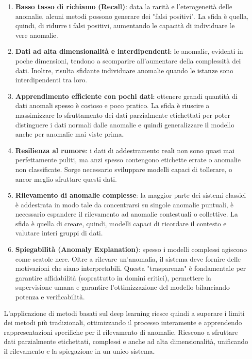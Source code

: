 \begin{enumerate}
    \item \textbf{Basso tasso di richiamo (Recall)}: data la rarità e l'eterogeneità delle anomalie, alcuni metodi possono generare dei "falsi positivi". La sfida è quella, quindi, di ridurre i falsi positivi, aumentando le capacità di individuare le vere anomalie.
    \item \textbf{Dati ad alta dimensionalità e interdipendenti}: le anomalie, evidenti in poche dimensioni, tendono a scomparire all'aumentare della complessità dei dati. Inoltre, risulta sfidante individuare anomalie quando le istanze sono interdipendenti tra loro.
    \item \textbf{Apprendimento efficiente con pochi dati}: ottenere grandi quantità di dati anomali spesso è costoso e poco pratico. La sfida è riuscire a massimizzare lo sfruttamento dei dati parzialmente etichettati per poter distinguere i dati normali dalle anomalie e quindi generalizzare il modello anche per anomalie mai viste prima.
    \item \textbf{Resilienza al rumore}: i dati di addestramento reali non sono quasi mai perfettamente puliti, ma anzi spesso contengono etichette errate o anomalie non classificate. Sorge necessario sviluppare modelli capaci di tollerare, o ancor meglio sfruttare questi dati.
    \item \textbf{Rilevamento di anomalie complesse}: la maggior parte dei sistemi classici è addestrata in modo tale da concentrarsi su singole anomalie puntuali, è necessario espandere il rilevamento ad anomalie contestuali o collettive. La sfida è quella di creare, quindi, modelli capaci di ricordare il contesto e valutare interi gruppi di dati.
    \item \textbf{Spiegabilità (Anomaly Explanation)}: spesso i modelli complessi agiscono come scatole nere. Oltre a rilevare un'anomalia, il sistema deve fornire delle motivazioni che siano interpretabili. Questa "trasparenza" è fondamentale per garantire affidabilità (soprattutto in domini critici), permettere la supervisione umana e garantire l'ottimizzazione del modello bilanciando potenza e verificabilità.
\end{enumerate} 

L'applicazione di metodi basati sul deep learning riesce quindi a superare i limiti dei metodi più tradizionali, ottimizzando il processo interamente e apprendendo rappresentazioni specifiche per il rilevamento di anomalie. Riescono a sfruttare dati parzialmente etichettati, complessi e anche ad alta dimensionalità, unificando il rilevamento e la spiegazione in un unico sistema.

